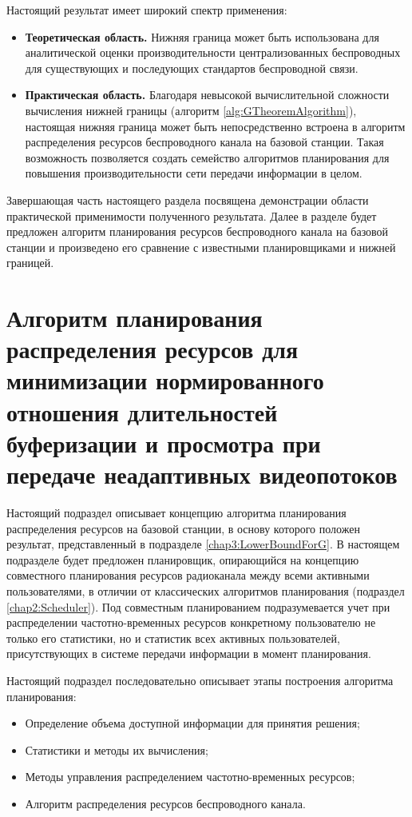 Настоящий результат имеет широкий спектр применения:
\begin{itemize}
	\item \textbf{Теоретическая область.} Нижняя граница может быть использована для аналитической оценки производительности централизованных беспроводных для существующих и последующих стандартов беспроводной связи.
	\item \textbf{Практическая область.} Благодаря невысокой вычислительной сложности вычисления нижней границы (алгоритм \ref{alg:GTheoremAlgorithm}), настоящая нижняя граница может быть непосредственно встроена в алгоритм распределения ресурсов беспроводного канала на базовой станции. Такая возможность позволяется создать семейство алгоритмов планирования для повышения производительности сети передачи информации в целом.
\end{itemize}

Завершающая часть настоящего раздела посвящена демонстрации области практической применимости полученного результата. Далее в разделе будет предложен алгоритм планирования ресурсов беспроводного канала на базовой станции и произведено его сравнение с известными планировщиками и нижней границей.

\section{Алгоритм планирования распределения ресурсов для минимизации нормированного отношения длительностей буферизации и просмотра при передаче неадаптивных видеопотоков}
\label{chap3:NonAdaptiveScheduler}

Настоящий подраздел описывает концепцию алгоритма планирования распределения ресурсов на базовой станции, в основу которого положен результат, представленный в подразделе \ref{chap3:LowerBoundForG}. В настоящем подразделе будет предложен планировщик, опирающийся на концепцию совместного планирования ресурсов радиоканала между всеми активными пользователями, в отличии от классических алгоритмов планирования (подраздел \ref{chap2:Scheduler}). Под совместным планированием подразумевается учет при распределении частотно-временных ресурсов конкретному пользователю не только его статистики, но и статистик всех активных пользователей, присутствующих в системе передачи информации в момент планирования.

Настоящий подраздел последовательно описывает этапы построения алгоритма планирования:
\begin{itemize}
	\item Определение объема доступной информации для принятия решения;
	\item Статистики и методы их вычисления;
	\item Методы управления распределением частотно-временных ресурсов;
	\item Алгоритм распределения ресурсов беспроводного канала.
\end{itemize}

